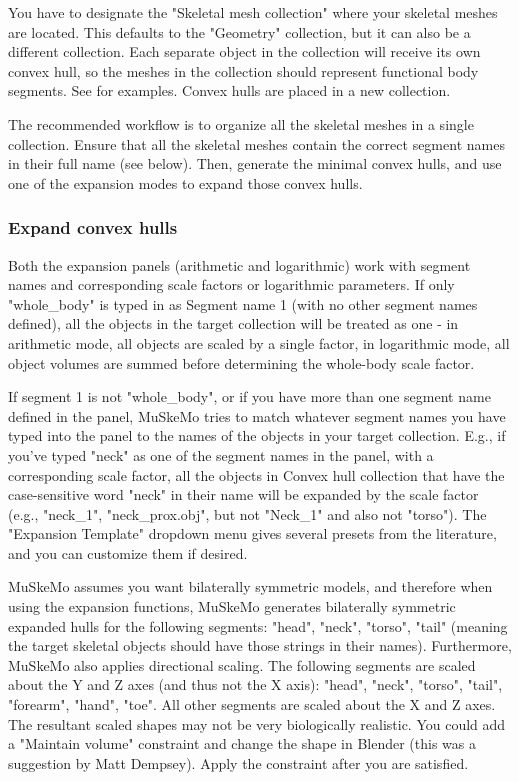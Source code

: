 \documentclass{article}
\begin{document}
You have to designate the "Skeletal mesh collection" where your skeletal meshes are located. This defaults to the "Geometry" collection, but it can also be a different collection. Each separate object in the collection will receive its own convex hull, so the meshes in the collection should represent functional body segments. See \cite{sellersMinimumConvexHull2012,coathamConvexHullEstimation2021, macaulayDecouplingBodyShape2023} for examples. Convex hulls are placed in a new collection. 

The recommended workflow is to organize all the skeletal meshes in a single collection. Ensure that all the skeletal meshes contain the correct segment names in their full name (see below). Then, generate the minimal convex hulls, and use one of the expansion modes to expand those convex hulls.


\subsubsection{Expand convex hulls} 

Both the expansion panels (arithmetic and logarithmic) work with segment names and corresponding scale factors or logarithmic parameters. If only "whole\_body" is typed in as Segment name 1 (with no other segment names defined), all the objects in the target collection will be treated as one - in arithmetic mode, all objects are scaled by a single factor, in logarithmic mode, all object volumes are summed before determining the whole-body scale factor. 

If segment 1 is not "whole\_body", or if you have more than one segment name defined in the panel, MuSkeMo tries to match whatever segment names you have typed into the panel to the names of the objects in your target collection. E.g., if you've typed "neck" as one of the segment names in the panel, with a corresponding scale factor, all the objects in Convex hull collection that have the case-sensitive word "neck" in their name will be expanded by the scale factor (e.g., "neck\_1", "neck\_prox.obj", but not "Neck\_1" and also not "torso"). The "Expansion Template" dropdown menu gives several presets from the literature, and you can customize them if desired.

MuSkeMo assumes you want bilaterally symmetric models, and therefore when using the expansion functions, MuSkeMo generates bilaterally symmetric expanded hulls for the following segments: "head", "neck", "torso", "tail" (meaning the target skeletal objects should have those strings in their names). Furthermore, MuSkeMo also applies directional scaling. The following segments are scaled about the Y and Z axes (and thus not the X axis): "head", "neck", "torso", "tail", "forearm", "hand", "toe". All other segments are scaled about the X and Z axes. The resultant scaled shapes may not be very biologically realistic. You could add a "Maintain volume" constraint and change the shape in Blender (this was a suggestion by Matt Dempsey). Apply the constraint after you are satisfied.
\end{document}
